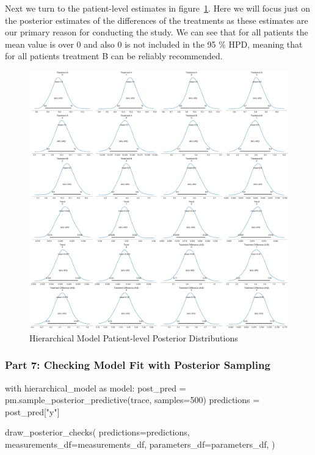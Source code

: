 \documentclass[12pt,a4paper,leqno]{report}
\theoremstyle{plain}
\theoremstyle{definition}
\theoremstyle{remark}
\begin{document}
Next we turn to the patient-level estimates in figure\
\ref{hierarchicalmodelpatientposteriors}. Here we will focus just on the
posterior estimates of the differences of the treatments as these estimates are our
primary reason for conducting the study. We can see that for all patients
the mean value is over 0 and also 0 is not included in the 95 \% HPD, meaning that for
all patients treatment B can be reliably recommended.

\bigskip
\begin{figure}[H]
    \caption{Hierarchical Model Patient-level Posterior Distributions}\label{hierarchicalmodelpatientposteriors}
    \bigskip
    \includegraphics[width=\textwidth,height=\textheight,keepaspectratio]{hierarchical_model_patient_level_posteriors.pdf}
\end{figure}
\bigskip

\subsubsection*{Part 7: Checking Model Fit with Posterior Sampling}

\bigskip
\begin{pyverbatim}[][fontsize=\footnotesize]
with hierarchical_model as model:
    post_pred = pm.sample_posterior_predictive(trace, samples=500)
    predictions = post_pred["y"]

draw_posterior_checks(
    predictions=predictions,
    measurements_df=measurements_df,
    parameters_df=parameters_df,
)
\end{pyverbatim}
\smallskip
\end{document}
